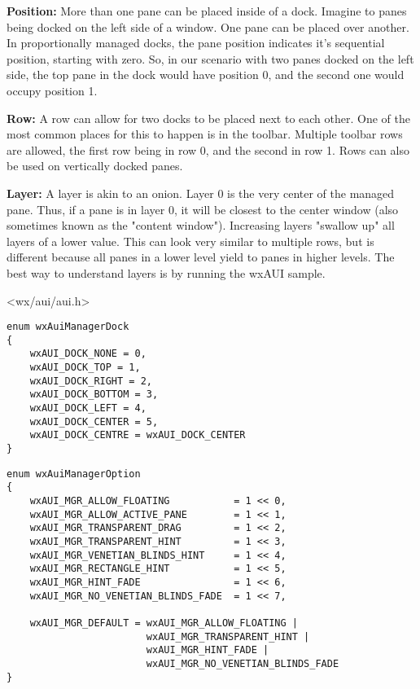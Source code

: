 {\bf Position:}
More than one pane can be placed inside of a dock. Imagine to panes
being docked on the left side of a window. One pane can be placed over
another. In proportionally managed docks, the pane position indicates
it's sequential position, starting with zero. So, in our scenario with
two panes docked on the left side, the top pane in the dock would have
position 0, and the second one would occupy position 1.

{\bf Row:}
A row can allow for two docks to be placed next to each other. One of
the most common places for this to happen is in the toolbar. Multiple
toolbar rows are allowed, the first row being in row 0, and the second
in row 1. Rows can also be used on vertically docked panes.


{\bf Layer:}
A layer is akin to an onion. Layer 0 is the very center of the
managed pane. Thus, if a pane is in layer 0, it will be closest to the
center window (also sometimes known as the "content window").
Increasing layers "swallow up" all layers of a lower value. This can
look very similar to multiple rows, but is different because all panes
in a lower level yield to panes in higher levels. The best way to
understand layers is by running the wxAUI sample.




<wx/aui/aui.h>




\begin{verbatim}
enum wxAuiManagerDock
{
    wxAUI_DOCK_NONE = 0,
    wxAUI_DOCK_TOP = 1,
    wxAUI_DOCK_RIGHT = 2,
    wxAUI_DOCK_BOTTOM = 3,
    wxAUI_DOCK_LEFT = 4,
    wxAUI_DOCK_CENTER = 5,
    wxAUI_DOCK_CENTRE = wxAUI_DOCK_CENTER
}
\end{verbatim}

\begin{verbatim}
enum wxAuiManagerOption
{
    wxAUI_MGR_ALLOW_FLOATING           = 1 << 0,
    wxAUI_MGR_ALLOW_ACTIVE_PANE        = 1 << 1,
    wxAUI_MGR_TRANSPARENT_DRAG         = 1 << 2,
    wxAUI_MGR_TRANSPARENT_HINT         = 1 << 3,
    wxAUI_MGR_VENETIAN_BLINDS_HINT     = 1 << 4,
    wxAUI_MGR_RECTANGLE_HINT           = 1 << 5,
    wxAUI_MGR_HINT_FADE                = 1 << 6,
    wxAUI_MGR_NO_VENETIAN_BLINDS_FADE  = 1 << 7,

    wxAUI_MGR_DEFAULT = wxAUI_MGR_ALLOW_FLOATING |
                        wxAUI_MGR_TRANSPARENT_HINT |
                        wxAUI_MGR_HINT_FADE |
                        wxAUI_MGR_NO_VENETIAN_BLINDS_FADE
}
\end{verbatim}


